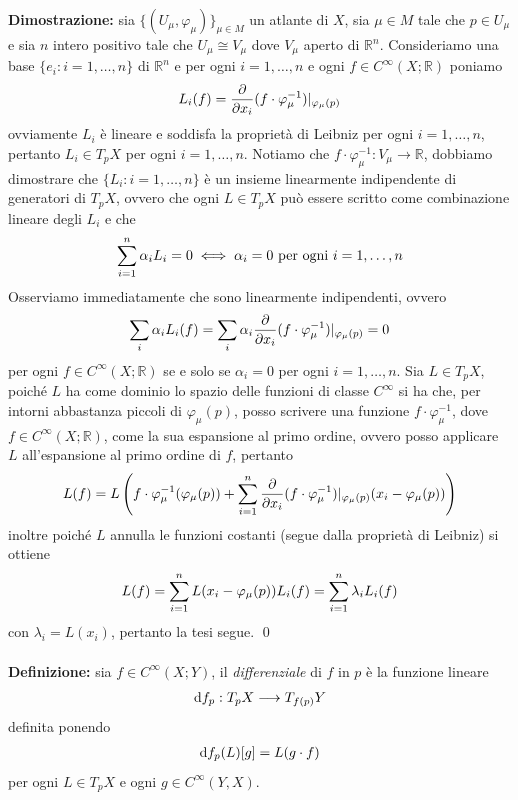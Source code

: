 \documentclass{article}
\begin{document}
\textbf{Dimostrazione:} sia $\{ (U_\mu, \varphi_\mu) \}_{\mu \in M}$ un atlante di $X$, sia $\mu \in M$ tale che $p \in U_\mu$ e sia $n$ intero positivo tale che $U_\mu \cong V_\mu$ dove $V_\mu$ aperto di $\mathbb{R}^n$. Consideriamo una base $\{ e_i : i = 1, \dots, n \}$ di $\mathbb{R}^n$ e per ogni $i = 1, \dots, n$ e ogni $f \in C^{\infty}(X; \mathbb{R})$ poniamo
\begin{gather}
    L_i(f) = \frac{\partial}{ \partial x_i}(f \cdot \varphi^{-1}_\mu)|_{\varphi_\mu(p)} \notag
\end{gather}
ovviamente $L_i$ è lineare e soddisfa la proprietà di Leibniz per ogni $i = 1, \dots, n$, pertanto $L_i \in T_p X$ per ogni $i = 1, \dots, n$. Notiamo che $f \cdot \varphi^{-1}_\mu : V_\mu \longrightarrow \mathbb{R}$, dobbiamo dimostrare che $\{ L_i : i = 1, \dots, n \}$ è un insieme linearmente indipendente di generatori di $T_p X$, ovvero che ogni $L \in T_p X$ può essere scritto come combinazione lineare degli $L_i$ e che
\begin{gather}
    \sum_{i = 1}^n \alpha_i L_i = 0 \iff \alpha_i = 0 \text{ per ogni } i = 1, \dots, n \notag
\end{gather}
Osserviamo immediatamente che sono linearmente indipendenti, ovvero
\begin{gather}
    \sum_i \alpha_i L_i(f) = \sum_i \alpha_i \frac{\partial}{\partial x_i}(f \cdot \varphi^{-1}_\mu)|_{\varphi_\mu(p)} = 0 \notag
\end{gather}
per ogni $f \in C^{\infty}(X; \mathbb{R})$ se e solo se $\alpha_i = 0$ per ogni $i = 1, \dots, n$. Sia $L \in T_p X$, poiché $L$ ha come dominio lo spazio delle funzioni di classe $C^{\infty}$ si ha che, per intorni abbastanza piccoli di $\varphi_\mu(p)$, posso scrivere una funzione $f \cdot \varphi^{-1}_\mu$, dove $f \in C^{\infty}(X; \mathbb{R})$, come la sua espansione al primo ordine, ovvero posso applicare $L$ all'espansione al primo ordine di $f$, pertanto
\begin{gather}
    L(f) = L \left( f \cdot \varphi^{-1}_\mu(\varphi_\mu(p)) + \sum_{i = 1}^n \frac{\partial}{\partial x_i}(f \cdot \varphi^{-1}_\mu)|_{\varphi_\mu(p)} (x_i - \varphi_\mu(p)) \right) \notag
\end{gather}
inoltre poiché $L$ annulla le funzioni costanti (segue dalla proprietà di Leibniz) si ottiene
\begin{gather}
    L(f) = \sum_{i = 1}^n L(x_i - \varphi_\mu(p))L_i(f) = \sum_{i = 1}^n \lambda_i L_i(f) \notag
\end{gather}
con $\lambda_i = L(x_i)$, pertanto la tesi segue. \qed \\ \\
\textbf{Definizione:} sia $f \in C^{\infty}(X; Y)$, il \textit{differenziale} di $f$ in $p$ è la funzione lineare
\begin{gather}
    \mathrm{d}f_p : T_pX \longrightarrow T_{f(p)}Y \notag
\end{gather}
definita ponendo
\begin{gather}
    \mathrm{d}f_p(L)[g] = L(g \cdot f) \notag
\end{gather}
per ogni $L \in T_pX$ e ogni $g \in C^{\infty}(Y, X)$.
\end{document}
